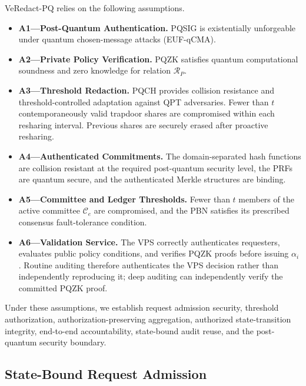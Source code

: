 \documentclass[lettersize,journal]{IEEEtran}
\begin{document}
VeRedact-PQ relies on the following assumptions.

\begin{itemize}

\item \textbf{A1---Post-Quantum Authentication.}
PQSIG is existentially unforgeable under quantum chosen-message
attacks (EUF-qCMA).

\item \textbf{A2---Private Policy Verification.}
PQZK satisfies quantum computational soundness and zero knowledge for
relation $\mathcal{R}_P$.

\item \textbf{A3---Threshold Redaction.}
PQCH provides collision resistance and threshold-controlled adaptation
against QPT adversaries. Fewer than $t$ contemporaneously valid
trapdoor shares are compromised within each resharing interval.
Previous shares are securely erased after proactive resharing.

\item \textbf{A4---Authenticated Commitments.}
The domain-separated hash functions are collision resistant at the
required post-quantum security level, the PRFs are quantum secure, and
the authenticated Merkle structures are binding.

\item \textbf{A5---Committee and Ledger Thresholds.}
Fewer than $t$ members of the active committee $\mathcal{C}_e$ are
compromised, and the PBN satisfies its prescribed consensus
fault-tolerance condition.

\item \textbf{A6---Validation Service.}
The VPS correctly authenticates requesters, evaluates public policy
conditions, and verifies PQZK proofs before issuing $\alpha_i$.
Routine auditing therefore authenticates the VPS decision rather than
independently reproducing it; deep auditing can independently verify
the committed PQZK proof.

\end{itemize}

Under these assumptions, we establish request admission security,
threshold authorization, authorization-preserving aggregation,
authorized state-transition integrity, end-to-end accountability,
state-bound audit reuse, and the post-quantum security boundary.

\subsection{State-Bound Request Admission}
\end{document}
